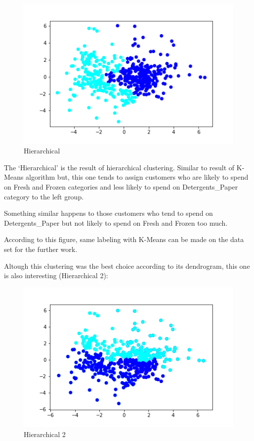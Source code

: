 \documentclass[11pt]{article}
\makeatletter
\def\maxwidth{\ifdim\Gin@nat@width>\linewidth\linewidth
    \else\Gin@nat@width\fi}
\let\Oldincludegraphics\includegraphics
\renewcommand{\includegraphics}[1]{\Oldincludegraphics[width=.8\maxwidth]{#1}}
\makeatother
\begin{document}
    \begin{figure}[!h]
\centering
\includegraphics{img/hierarchical_fav.png}
\caption{Hierarchical}
\end{figure}

    The `Hierarchical' is the result of hierarchical clustering. Similar to
result of K-Means algorithm but, this one tends to assign customers who
are likely to spend on Fresh and Frozen categories and less likely to
spend on Detergents\_Paper category to the left group.

Something similar happens to those customers who tend to spend on
Detergents\_Paper but not likely to spend on Fresh and Frozen too much.

According to this figure, same labeling with K-Means can be made on the
data set for the further work.

Altough this clustering was the best choice according to its dendrogram,
this one is also interesting (Hierarchical 2):

    \begin{figure}[!h]
\centering
\includegraphics{img/hierarchical_fav2.png}
\caption{Hierarchical 2}
\end{figure}
\end{document}
